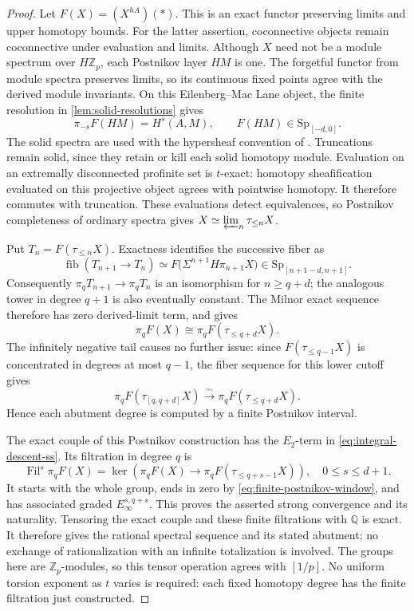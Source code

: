 \documentclass[11pt]{article}
\numberwithin{equation}{section}
\theoremstyle{definition}
\theoremstyle{remark}
\begin{document}
\begin{proof}
Let $F(X)=(X^{hA})(*)$.  This is an exact functor preserving limits and
upper homotopy bounds.  For the latter assertion, coconnective objects
remain coconnective under evaluation and limits.  Although $X$ need not
be a module spectrum over $H\mathbb Z_p$, each Postnikov layer $HM$ is one.
The forgetful functor from module spectra preserves limits, so its
continuous fixed points agree with the derived module invariants.
On this Eilenberg--Mac Lane object, the finite
resolution in \cref{lem:solid-resolutions} gives
\[
 \pi_{-s}F(HM)=H^s(A,M),\qquad
 F(HM)\in\mathrm{Sp}_{[-d,0]}.
\]
The solid spectra are used with the hypersheaf convention of
\cite[Section~4.5, especially Proposition~4.5.5]{BMR2026}.
Truncations remain solid, since they retain or kill each solid homotopy
module.  Evaluation on an extremally disconnected profinite set is
$t$-exact: homotopy sheafification evaluated on this projective object
agrees with pointwise homotopy.  It therefore commutes with truncation.
These evaluations detect equivalences, so Postnikov completeness of
ordinary spectra gives
$X\simeq\varprojlim_n\tau_{\leq n}X$.

Put $T_n=F(\tau_{\leq n}X)$.  Exactness identifies the successive fiber as
\[
 \operatorname{fib}(T_{n+1}\longrightarrow T_n)
   \simeq F\bigl(\Sigma^{n+1}H\pi_{n+1}X\bigr)
   \in\mathrm{Sp}_{[n+1-d,n+1]}.
\]
Consequently $\pi_qT_{n+1}\to\pi_qT_n$ is an isomorphism for
$n\geq q+d$; the analogous tower in degree $q+1$ is also eventually
constant.  The Milnor exact sequence therefore has zero derived-limit
term, and gives
\begin{equation}\label{eq:finite-postnikov-window}
 \pi_qF(X)\cong\pi_qF(\tau_{\leq q+d}X).
\end{equation}
The infinitely negative tail causes no further issue: since
$F(\tau_{\leq q-1}X)$ is concentrated in degrees at most $q-1$, the
fiber sequence for this lower cutoff gives
\[
 \pi_qF(\tau_{[q,q+d]}X)
     \xrightarrow{\ \sim\ }\pi_qF(\tau_{\leq q+d}X).
\]
Hence each abutment degree is computed by a finite Postnikov interval.

The exact couple of this Postnikov construction has the $E_2$-term in
\eqref{eq:integral-descent-ss}.  Its filtration in degree $q$ is
\[
 \operatorname{Fil}^{s}\pi_qF(X)
 =\ker\!\left(\pi_qF(X)\longrightarrow
              \pi_qF(\tau_{\leq q+s-1}X)\right),
 \quad 0\leq s\leq d+1.
\]
It starts with the whole group, ends in zero by
\eqref{eq:finite-postnikov-window}, and has associated graded
$E_\infty^{s,q+s}$.  This proves the asserted strong convergence and its
naturality.  Tensoring the exact couple and these finite filtrations with
$\mathbb Q$ is exact.  It therefore gives the rational spectral sequence and
its stated abutment; no exchange of rationalization with an infinite
totalization is involved.  The groups here are $\mathbb Z_p$-modules, so this
tensor operation agrees with $[1/p]$.
No uniform torsion exponent as $t$ varies is required: each fixed
homotopy degree has the finite filtration just constructed.
\end{proof}
\end{document}

